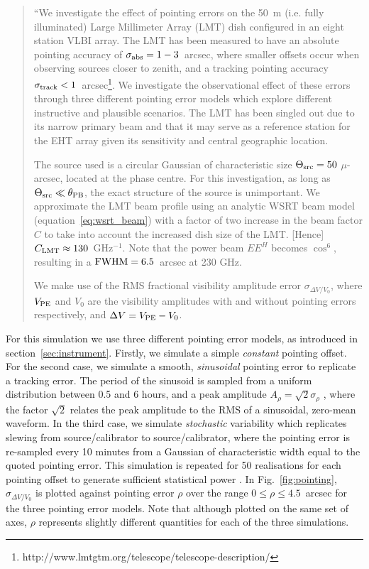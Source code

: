\begin{quotation}
``We investigate the effect of pointing errors on the 50~m (i.e. fully illuminated) Large Millimeter Array (LMT) dish configured in an eight station VLBI array. The LMT has been measured to have an absolute pointing accuracy of $\sigma_{\rm abs} = 1-3$~arcsec, where smaller offsets occur when observing sources closer to zenith, and a tracking pointing accuracy $\sigma_{\rm track} < 1$~arcsec\footnote{http://www.lmtgtm.org/telescope/telescope-description/}. We investigate the observational effect of these errors through three different pointing error models which explore different instructive and plausible scenarios. The LMT has been singled out due to its narrow primary beam and that it may serve as a reference station for the EHT array given its sensitivity and central geographic location. 

The source used is a circular Gaussian of characteristic size $\Theta_{\rm src}=50$ $\mu$-arcsec, located at the phase centre. For this investigation, as long as $\Theta_{\rm src} \ll \theta_{\rm PB}$, the exact structure of the source is unimportant. We approximate the LMT beam profile using an analytic WSRT beam model (equation~\ref{eq:wsrt_beam}) with a factor of two increase in the beam factor $C$ to take into account the increased dish size of the LMT. [Hence] $C_{\rm LMT} \approx 130$~GHz$^{-1}$. Note that the power beam $EE^H$ becomes $\cos^6$, resulting in a $\rm{FWHM} = 6.5 $~arcsec at 230 GHz.


We make use of the RMS fractional visibility amplitude error $\sigma_{\Delta V/V_0}$, where $V_{\rm PE}$ and $V_{0}$ are the visibility amplitudes with and without pointing errors respectively, and  $\Delta V = V_{\rm PE} - V_{0}$.
\\
\citep{Blecher_2016}
\end{quotation}

For this simulation we use three different pointing error models, as introduced in section~\ref{sec:instrument}. Firstly, we simulate a simple \emph{constant} pointing offset. For the second case, we simulate a smooth, \emph{sinusoidal} pointing error to replicate a tracking error. The period of the sinusoid is sampled from a uniform distribution between 0.5 and 6 hours, and a peak amplitude $A_{\rho} = \sqrt{2} \sigma_{\rho}$ , where the factor $\sqrt{2}$ relates the peak amplitude to the RMS of a sinusoidal, zero-mean waveform.  In the third case, we simulate \emph{stochastic} variability which replicates slewing from source/calibrator to source/calibrator, where the pointing error is re-sampled every 10 minutes from a Gaussian of characteristic width equal to the quoted pointing error. This simulation is repeated for 50 realisations for each pointing offset to generate sufficient statistical power \citep{Blecher_2016}. In Fig.~\ref{fig:pointing}, $\sigma_{\Delta V/V_0}$ is plotted against pointing error $\rho$ over the range $0 \le \rho \le 4.5$~arcsec for the three pointing error models. Note that although plotted on the same set of axes, $\rho$ represents slightly different quantities for each of the three simulations.

